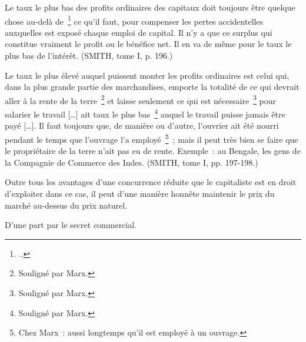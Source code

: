 \documentclass[french,twoside]{book} %
\newenvironment{quoteblock}%
  {\begin{quoting}}
  {\end{quoting}}
\newenvironment{quotebar}{%
    \def\FrameCommand{{\color{rubric!10!}\vrule width 0.5em} \hspace{0.9em}}%
    \def\OuterFrameSep{\itemsep} %
    \MakeFramed {\advance\hsize-\width \FrameRestore}
  }%
  {%
    \endMakeFramed
  }
\renewenvironment{quoteblock}%
  {%
    \savenotes
    \setstretch{0.9}
    \normalfont
    \begin{quotebar}
  }
  {%
    \end{quotebar}
    \spewnotes
  }
\begin{document}
\begin{quoteblock}
 \noindent Le taux le plus bas des profits ordinaires des capitaux doit toujours être quelque chose au-delà de \footnote{ ..} ce qu’il faut, pour compenser les pertes accidentelles auxquelles est exposé chaque emploi de capital. Il n’y a que ce surplus qui constitue vraiment le profit ou le bénéfice net. Il en va de même pour le taux le plus bas de l’intérêt. (SMITH, tome I, p. 196.)\par
 [III] Le taux le plus élevé auquel puissent monter les profits ordinaires est celui qui, dans la plus grande partie des marchandises, emporte la totalité de ce qui devrait aller à la rente de la terre \footnote{Souligné par Marx.} et laisse seulement ce qui est nécessaire \footnote{Souligné par Marx.} pour salarier le travail […] ait taux le plus bas \footnote{Souligné par Marx.} auquel le travail puisse jamais être payé […]. Il faut toujours que, de manière ou d’autre, l’ouvrier ait été nourri pendant le temps que l’ouvrage l’a employé \footnote{Chez Marx : aussi longtemps qu’il est employé à un ouvrage.} ; mais il peut très bien se faire que le propriétaire de la terre n’ait pas eu de rente. Exemple : au Bengale, les gens de la Compagnie de Commerce des Indes. (SMITH, tome I, pp. 197-198.)
 \end{quoteblock}

\noindent Outre tous les avantages d’une concurrence réduite que le capitaliste est en droit d’exploiter dans ce cas, il peut d’une manière honnête maintenir le prix du marché au-dessus du prix naturel.\par
D’une part par le secret commercial.\par
\end{document}
